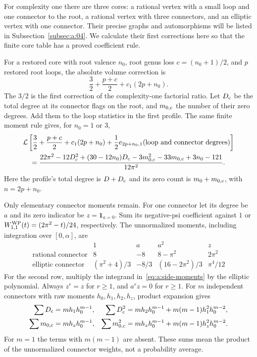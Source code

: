 For complexity one there are three cores: a rational vertex with a
small loop and one connector to the root, a rational vertex with three
connectors, and an elliptic vertex with one connector. Their precise
graphs and automorphisms will be listed in
Subsection~\ref{subsec:a:04}. We calculate their first corrections
here so that the finite core table has a proved coefficient rule.

For a restored core with root valence $n_0$, root genus loss
$c=(n_0+1)/2$, and $p$ restored root loops, the absolute volume
correction is
\[
 \frac32+\frac{p+c}{2}+c_1(2p+n_0).
\]
The $3/2$ is the first correction of the complexity-one factorial
ratio. Let $D_{\rm c}$ be the total degree at its connector flags on
the root, and $m_{0,\rm c}$ the number of their zero degrees. Add them
to the loop statistics in the first profile. The same finite moment
rule gives, for $n_0=1$ or $3$,
\begin{align}
 &\mathcal L\left[\frac32+\frac{p+c}{2}+c_1(2p+n_0)
       +\frac12e_{2p+n_0,1}(\text{loop and connector degrees})\right]
 \notag\\
 &\quad=\frac{22\pi^2-12D_{\rm c}^2+(30-12n_0)D_{\rm c}
      -3m_{0,\rm c}^2-33m_{0,\rm c}+3n_0-121}{12\pi^2}.
 \label{eq:a:q-one-loop-average}
\end{align}
Here the profile's total degree is $D+D_{\rm c}$ and its zero count
is $m_0+m_{0,\rm c}$, with $n=2p+n_0$.

Only elementary connector moments remain. For one connector let its
degree be $a$ and its zero indicator be $z=\mathbf1_{a=0}$. Sum its
negative-psi coefficient against $1$ or
$W^{\rm WP}_{1,1}(t)=(2\pi^2-t)/24$, respectively. The unnormalized
moments, including integration over $[0,\alpha]$, are
\begin{equation}\label{eq:a:connector-moments}
\begin{array}{c|rrrr}
 &1&a&a^2&z\\\hline
 \text{rational connector}&8&-8&8-\pi^2&2\pi^2\\
 \text{elliptic connector}&(\pi^2+4)/3&-8/3&(16-2\pi^2)/3&\pi^4/12
\end{array}
\end{equation}
For the second row, multiply the integrand
in~\eqref{eq:a:side-moments} by the elliptic polynomial. Always $z^r=z$
for $r\geq1$, and $a^r z=0$ for $r\geq1$. For $m$ independent
connectors with raw moments $h_0,h_1,h_2,h_z$, product expansion gives
\begin{align*}
 \sum D_{\rm c}&=mh_1h_0^{m-1},&
 \sum D_{\rm c}^2&=mh_2h_0^{m-1}+m(m-1)h_1^2h_0^{m-2},\\
 \sum m_{0,\rm c}&=mh_zh_0^{m-1},&
 \sum m_{0,\rm c}^2&=mh_zh_0^{m-1}+m(m-1)h_z^2h_0^{m-2}.
\end{align*}
For $m=1$ the terms with $m(m-1)$ are absent. These sums mean the
product of the unnormalized connector weights, not a probability
average.

